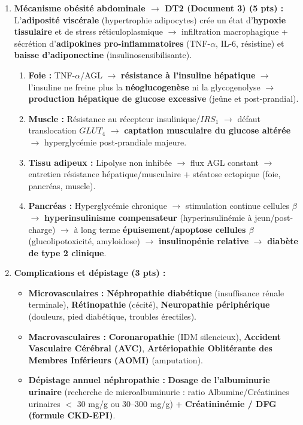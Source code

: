 \documentclass[11pt]{article}
\begin{document}
\begin{corrige}
\begin{enumerate}
\item \textbf{Mécanisme obésité abdominale $\rightarrow$ DT2 (Document 3) (5 pts) :}
L'\textbf{adiposité viscérale} (hypertrophie adipocytes) crée un état d'\textbf{hypoxie tissulaire} et de stress réticuloplasmique $\rightarrow$ infiltration macrophagique + sécrétion d'\textbf{adipokines pro-inflammatoires} (TNF-$\alpha$, IL-6, résistine) et \textbf{baisse d'adiponectine} (insulinosensibilisante).
\begin{enumerate}
\item \textbf{Foie :} TNF-$\alpha$/AGL $\rightarrow$ \textbf{résistance à l'insuline hépatique} $\rightarrow$ l'insuline ne freine plus la \textbf{néoglucogenèse} ni la glycogenolyse $\rightarrow$ \textbf{production hépatique de glucose excessive} (jeûne et post-prandial).
\item \textbf{Muscle :} Résistance au récepteur insulinique/$IRS_1$ $\rightarrow$ défaut translocation \textbf{$GLUT_4$} $\rightarrow$ \textbf{captation musculaire du glucose altérée} $\rightarrow$ hyperglycémie post-prandiale majeure.
\item \textbf{Tissu adipeux :} Lipolyse non inhibée $\rightarrow$ flux AGL constant $\rightarrow$ entretien résistance hépatique/musculaire + stéatose ectopique (foie, pancréas, muscle).
\item \textbf{Pancréas :} Hyperglycémie chronique $\rightarrow$ stimulation continue cellules $\beta$ $\rightarrow$ \textbf{hyperinsulinisme compensateur} (hyperinsulinémie à jeun/post-charge) $\rightarrow$ à long terme \textbf{épuisement/apoptose cellules $\beta$} (glucolipotoxicité, amyloidose) $\rightarrow$ \textbf{insulinopénie relative} $\rightarrow$ \textbf{diabète de type 2 clinique}.
\end{enumerate}

\item \textbf{Complications et dépistage (3 pts) :}
\begin{itemize}
\item \textbf{Microvasculaires :} \textbf{Néphropathie diabétique} (insuffisance rénale terminale), \textbf{Rétinopathie} (cécité), \textbf{Neuropathie périphérique} (douleurs, pied diabétique, troubles érectiles).
\item \textbf{Macrovasculaires :} \textbf{Coronaropathie} (IDM silencieux), \textbf{Accident Vasculaire Cérébral (AVC)}, \textbf{Artériopathie Oblitérante des Membres Inférieurs (AOMI)} (amputation).
\item \textbf{Dépistage annuel néphropathie :} \textbf{Dosage de l'albuminurie urinaire} (recherche de microalbuminurie : ratio Albumine/Créatinines urinaires $<$ 30 mg/g ou 30--300 mg/g) + \textbf{Créatininémie / DFG (formule CKD-EPI)}.
\end{itemize}


\end{enumerate}
\end{corrige}
\end{document}
